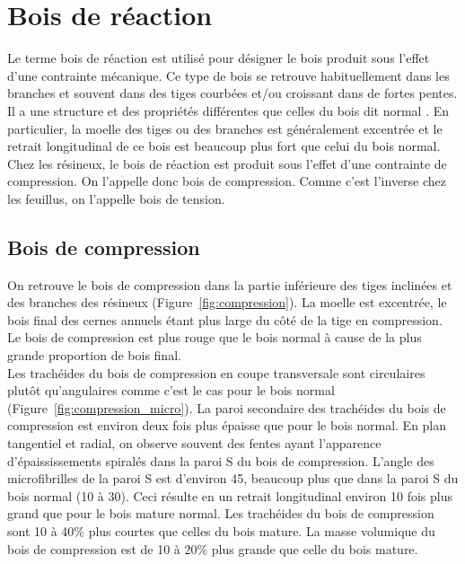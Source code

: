 \section{Bois de réaction}

Le terme bois de réaction est utilisé pour désigner le bois produit sous l'effet d'une contrainte mécanique. Ce type de bois se retrouve habituellement dans les branches et souvent dans des tiges courbées et/ou croissant dans de fortes pentes. Il a une structure et des propriétés différentes que celles du bois dit  \og normal  \fg. En particulier, la moelle des tiges ou des branches est généralement excentrée et le retrait longitudinal de ce bois est beaucoup plus fort que celui du bois normal. Chez les résineux, le bois de réaction est produit sous l'effet d'une contrainte de compression. On l'appelle donc bois de compression. Comme c'est l'inverse chez les feuillus, on l'appelle bois de tension.

\subsection{Bois de compression}\label{compression}

On retrouve le bois de compression dans la partie inférieure des tiges inclinées et des branches des résineux (Figure~\ref{fig:compression}). La moelle est excentrée, le bois final des cernes annuels étant plus large du côté de la tige en compression. Le bois de compression est plus \og rouge \fg que le bois normal à cause de la plus grande proportion de bois final.\\

Les trachéides du bois de compression en coupe transversale sont circulaires plutôt qu'angulaires comme c'est le cas pour le bois normal (Figure~\ref{fig:compression_micro}). La paroi secondaire des trachéides du bois de compression est environ deux fois plus épaisse que pour le bois normal. En plan tangentiel et radial, on observe souvent des fentes ayant l'apparence \og d'épaississements spiralés \fg dans la paroi S du bois de compression. L'angle des microfibrilles de la paroi S est d'environ 45\textdegree, beaucoup plus que dans la paroi S du bois normal (10 à 30\textdegree). Ceci résulte en un retrait longitudinal environ 10 fois plus grand que pour le bois mature normal. Les trachéides du bois de compression sont 10 à 40\% plus courtes que celles du bois mature. La masse volumique du bois de compression est de 10 à 20\% plus grande que celle du bois mature.

